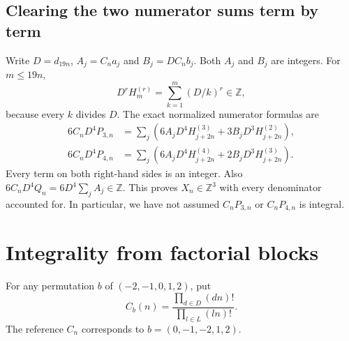 \documentclass[11pt]{article}
\newcommand{\Z}{\mathbb Z}
\begin{document}
\subsection{Clearing the two numerator sums term by term}
Write $D=d_{19n}$, $A_j=C_na_j$ and $B_j=DC_nb_j$.
Both $A_j$ and $B_j$ are integers. For $m\leq19n$,
\[
 D^rH_m^{(r)}=\sum_{k=1}^m(D/k)^r\in\Z,
\]
because every $k$ divides $D$. The exact normalized numerator formulas are
\begin{align*}
 6C_nD^4P_{3,n}
 &=\sum_j\left(6A_jD^4H^{(3)}_{j+2n}
                         +3B_jD^3H^{(2)}_{j+2n}\right),\\
 6C_nD^4P_{4,n}
 &=\sum_j\left(6A_jD^4H^{(4)}_{j+2n}
                         +2B_jD^3H^{(3)}_{j+2n}\right).
\end{align*}
Every term on both right-hand sides is an integer. Also
$6C_nD^4Q_n=6D^4\sum_jA_j\in\Z$.
This proves $X_n\in\Z^3$ with every denominator accounted for.
In particular, we have not assumed $C_nP_{3,n}$ or $C_nP_{4,n}$ is integral.

\section{Integrality from factorial blocks}
For any permutation $b$ of $(-2,-1,0,1,2)$, put
\[
 C_b(n)=\frac{\prod_{d\in D}(dn)!}{\prod_{l\in L}(ln)!}.
\]
The reference $C_n$ corresponds to $b=(0,-1,-2,1,2)$.
\end{document}
